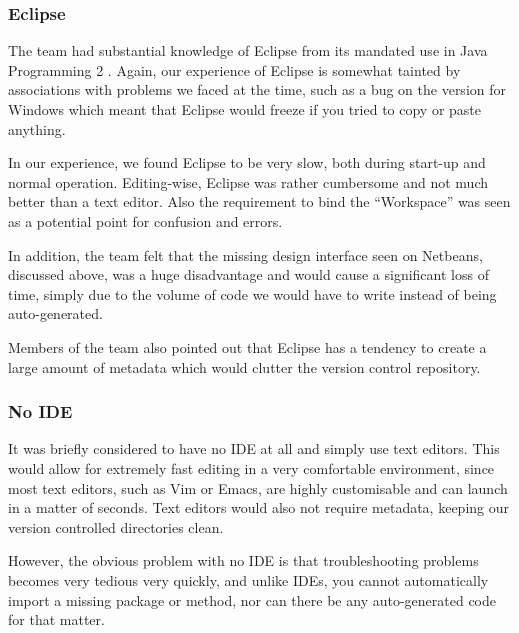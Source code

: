\subsubsection{Eclipse}
\label{impl:ui:ide:eclipse}

The team had substantial knowledge of Eclipse from its mandated use in
Java Programming 2 \cite{javaProgramming2}. Again, our experience of 
Eclipse is somewhat tainted by associations with problems we faced at 
the time, such as a bug on the version for Windows which meant that 
Eclipse would freeze if you tried to copy or paste anything.

In our experience, we found Eclipse to be very slow, both during 
start-up and normal operation. 
Editing-wise, Eclipse was rather cumbersome and not much better than a
text editor.
Also the requirement to bind the ``Workspace'' was seen as a potential
point for confusion and errors.

In addition, the team felt that the missing design interface seen on
Netbeans, discussed above, was a huge disadvantage and would cause a
significant loss of time, simply due to the volume of code we would
have to write instead of being auto-generated.

Members of the team also pointed out that Eclipse has a tendency to
create a large amount of metadata which would clutter the version
control repository.

\subsubsection{No IDE}
\label{impl:ui:ide:noide}

It was briefly considered to have no IDE at all and simply use text
editors.
This would allow for extremely fast editing in a very comfortable
environment, since most text editors, such as Vim or Emacs, are highly
customisable and can launch in a matter of seconds.
Text editors would also not require metadata, keeping our version
controlled directories clean.

However, the obvious problem with no IDE is that troubleshooting
problems becomes very tedious very quickly, and unlike IDEs, you
cannot automatically import a missing package or method, nor can there
be any auto-generated code for that matter.

